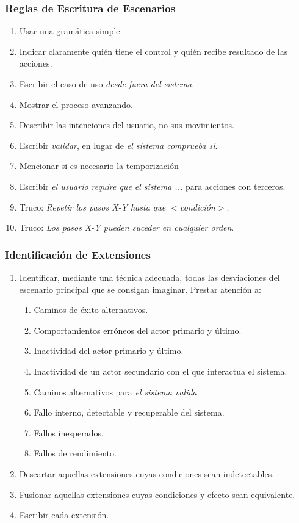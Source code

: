 \documentclass[slidestop,xcolor=pst,dvips,blue]{beamer}
\begin{document}
\begin{frame}[c]
    \frametitle{Reglas de Escritura de Escenarios}
    \begin{enumerate}[<+->]
        \item Usar una gramática simple.
        \item Indicar claramente quién tiene el control y quién recibe resultado de las acciones.
        \item Escribir el caso de uso \emph{desde fuera del sistema}.
        \item Mostrar el proceso avanzando.
        \item Describir las intenciones del usuario, no sus movimientos.
        \item Escribir \emph{validar}, en lugar de \emph{el sistema comprueba si}.
        \item Mencionar si es necesario la temporización
        \item Escribir \emph{el usuario require que el sistema ...} para acciones con terceros.
        \item Truco: \emph{Repetir los pasos X-Y hasta que $<$condición$>$}.
        \item Truco: \emph{Los pasos X-Y pueden suceder en cualquier orden}.
    \end{enumerate}
\end{frame}

\begin{frame}[c]
    \frametitle{Identificación de Extensiones}
    \begin{enumerate}[<+->]
        \item Identificar, mediante una técnica adecuada, todas las desviaciones del escenario principal que se consigan imaginar. Prestar atención a:
            \begin{enumerate}
                \item Caminos de éxito alternativos.
                \item Comportamientos erróneos del actor primario y último.
                \item Inactividad del actor primario y último.
                \item Inactividad de un actor secundario con el que interactua el sistema.
                \item Caminos alternativos para \emph{el sistema valida}.
                \item Fallo interno, detectable y recuperable del sistema.
                \item Fallos inesperados.
                \item Fallos de rendimiento.
            \end{enumerate}
        \item Descartar aquellas extensiones cuyas condiciones sean indetectables.
        \item Fusionar aquellas extensiones cuyas condiciones y efecto sean equivalente.
        \item Escribir cada extensión.
    \end{enumerate}
\end{frame}
\end{document}
